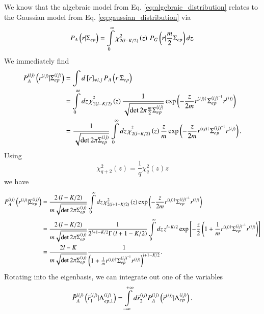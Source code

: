 We know that the algebraic model from Eq. \ref{eq:algebraic_distribution}
relates to the Gaussian model from Eq. \ref{eq:gaussian_distribution} via
\begin{equation}
    P_{A}\left(r|\Sigma_{ep}\right)=\intop_{0}^{\infty}\chi_{2\left(l-K/2\right)}^{2}\left(z\right)\,P_{G}\left(r|\frac{m}{2}\Sigma_{ep}\right)dz.
\end{equation}
We immediately find
\begin{align}
    P_{A}^{\left(ij\right)}\left(r^{\left(ij\right)}|\Sigma_{ep}^{\left(ij\right)}\right) & =\int d\left[r\right]_{\ne i,j}P_{A}\left(r|\Sigma_{ep}\right)\\
     & =\intop_{0}^{\infty}dz\,\chi_{2\left(l-K/2\right)}^{^{2}}\left(z\right)\frac{1}{\sqrt{\det2\pi\frac{m}{2}\Sigma_{ep}^{\left(ij\right)}}}\exp\left(-\frac{z}{2m}r^{\left(ij\right)\dagger}\Sigma_{ep}^{\left(ij\right)^{-1}}r^{\left(ij\right)}\right)\\
     & =\frac{1}{\sqrt{\det2\pi\Sigma_{ep}^{\left(ij\right)}}}\intop_{0}^{\infty}dz\,\chi_{2\left(l-K/2\right)}^{^{2}}\left(z\right)\frac{z}{m}\exp\left(-\frac{z}{2m}r^{\left(ij\right)\dagger}\Sigma_{ep}^{\left(ij\right)^{-1}}r^{\left(ij\right)}\right).
\end{align}
Using
\begin{equation}
    \chi_{q+2}^{2}\left(z\right)=\frac{1}{q}\chi_{q}^{2}\left(z\right)z
\end{equation}
we have
\begin{align}
    P_{A}^{\left(ij\right)}\left(r^{\left(ij\right)}|\Sigma_{ep}^{\left(ij\right)}\right) & =\frac{2\left(l-K/2\right)}{m\sqrt{\det2\pi\Sigma_{ep}^{\left(ij\right)}}}\intop_{0}^{\infty}dz\,\chi_{2\left(l+1-K/2\right)}^{2}\left(z\right)\exp\left(-\frac{z}{2m}r^{\left(ij\right)\dagger}\Sigma_{ep}^{\left(ij\right)^{-1}}r^{\left(ij\right)}\right)\\
    & =\frac{2\left(l-K/2\right)}{m\sqrt{\det2\pi\Sigma_{ep}^{\left(ij\right)}}}\frac{1}{2^{l+1-K/2}\Gamma\left(l+1-K/2\right)}\intop_{0}^{\infty}dz\,z^{l-K/2}\exp\left[-\frac{z}{2}\left(1+\frac{1}{m}r^{\left(ij\right)\dagger}\Sigma_{ep}^{\left(ij\right)^{-1}}r^{\left(ij\right)}\right)\right]\\
    & =\frac{2l-K}{m\sqrt{\det2\pi\Sigma_{ep}^{\left(ij\right)}}}\frac{1}{\left(1+\frac{1}{m}r^{\left(ij\right)\dagger}\Sigma_{ep}^{\left(ij\right)^{-1}}r^{\left(ij\right)}\right)^{l+1-K/2}} \label{eq:using_chi}.
\end{align}
Rotating into the eigenbasis, we can integrate out one of the variables
\begin{equation}
    \tilde{P}_{A}^{\left(ij\right)}\left(\bar{r}_{1}^{\left(ij\right)}|\Lambda_{ep,1}^{\left(ij\right)}\right)=\intop_{-\infty}^{+\infty}d\bar{r}_{2}^{\left(ij\right)}P_{A}^{\left(ij\right)}\left(\bar{r}^{\left(ij\right)}|\Lambda_{ep}^{\left(ij\right)}\right).
\end{equation}
